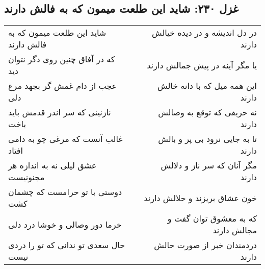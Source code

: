 \begin{center}
\section*{غزل ۲۳۰: شاید این طلعت میمون که به فالش دارند}
\label{sec:230}
\begin{longtable}{l p{0.5cm} r}
شاید این طلعت میمون که به فالش دارند
&&
در دل اندیشه و در دیده خیالش دارند
\\
که در آفاق چنین روی دگر نتوان دید
&&
یا مگر آینه در پیش جمالش دارند
\\
عجب از دام غمش گر بجهد مرغ دلی
&&
این همه میل که با دانه خالش دارند
\\
نازنینی که سر اندر قدمش باید باخت
&&
نه حریفی که توقع به وصالش دارند
\\
غالب آنست که مرغی چو به دامی افتاد
&&
تا به جایی نرود بی پر و بالش دارند
\\
عشق لیلی نه به اندازه هر مجنونیست
&&
مگر آنان که سر ناز و دلالش دارند
\\
دوستی با تو حرامست که چشمان کشت
&&
خون عشاق بریزند و حلالش دارند
\\
خرما دور وصالی و خوشا درد دلی
&&
که به معشوق توان گفت و مجالش دارند
\\
حال سعدی تو ندانی که تو را دردی نیست
&&
دردمندان خبر از صورت حالش دارند
\\
\end{longtable}
\end{center}
